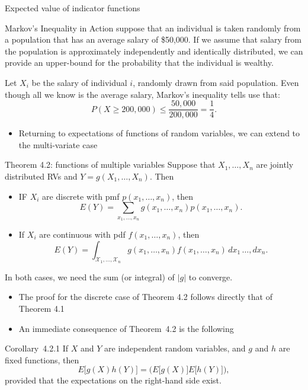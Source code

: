 \begin{frame}[allowframebreaks]{Expected value of indicator functions}
  \framebreak

  \begin{exampleblock}{Markov's Inequality in Action}
    suppose that an individual is taken randomly from a population that has an average salary of \$50,000. If we assume that salary from the population is approximately independently and identically distributed, we can provide an upper-bound for the probability that the individual is wealthy.
    
    Let $X_i$ be the salary of individual $i$, randomly drawn from said population. Even though all we know is the average salary, Markov's inequality tells use that:
    $$
    P(X \geq 200,000) \leq \frac{50,000}{200,000} = \frac{1}{4}. 
    $$
  \end{exampleblock}

  \framebreak

  \begin{itemize}
    \item Returning to expectations of functions of random variables, we can extend to the multi-variate case
  \end{itemize}
  
  \begin{block}{Theorem 4.2: functions of multiple variables}
    Suppose that $X_1, \ldots, X_n$ are jointly distributed RVs and $Y = g(X_1, \ldots, X_n)$. Then
    \begin{itemize}
      \item IF $X_i$ are discrete with pmf $p(x_1, \ldots, x_n)$, then
      $$
      E(Y) = \sum_{x_1, \ldots, x_n} g(x_1, \ldots, x_n)p(x_1, \ldots, x_n).
      $$
      \item If $X_i$ are continuous with pdf $f(x_1, \ldots, x_n)$, then
      $$
      E(Y) = \int_{\mathcal{X}_1, \ldots, \mathcal{X}_n}g(x_1, \ldots, x_n)f(x_1, \ldots, x_n)\, dx_1\,\ldots,dx_n.
      $$
    \end{itemize}
    In both cases, we need the sum (or integral) of $|g|$ to converge.
  \end{block}

\framebreak

\begin{itemize}
  \item The proof for the discrete case of Theorem 4.2 follows directly that of Theorem 4.1
  \item An immediate consequence of Theorem~4.2 is the following
\end{itemize}

\begin{block}{Corollary~4.2.1}
  If $X$ and $Y$ are independent random variables, and $g$ and $h$ are fixed functions, then
  $$
  E\big[g(X)h(Y)\big] = \Big(E\big[g(X)\big]E\big[h(Y)\big]\Big),
  $$
  provided that the expectations on the right-hand side exist.
\end{block}


\end{frame}
